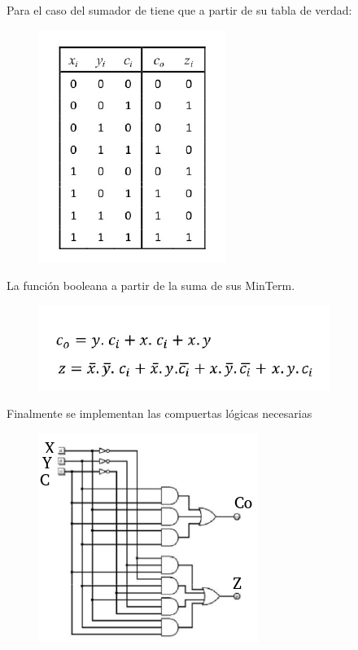 \documentclass[12pt,letterpaper]{book}
\begin{document}
Para el caso del sumador de tiene que a partir de su tabla de verdad:

\begin{figure}[H]
\centering
\includegraphics[width=0.5\linewidth]{figures/tabBoo3.png}
\caption{}
\label{tabBoo3}
\end{figure}
\vspace{0.2cm}

La función booleana a partir de la suma de sus MinTerm.

\begin{figure}[H]
\centering
\includegraphics[width=.5\linewidth]{figures/tabBoo4.png}
\caption{}
\label{tabBoo4}
\end{figure}
\vspace{0.2cm}

Finalmente se implementan las compuertas lógicas necesarias

\begin{figure}[H]
\centering
\includegraphics[width=.5\linewidth]{figures/tabBoo5.png}
\caption{}
\label{tabBoo5}
\end{figure}
\vspace{0.2cm}
\end{document}
